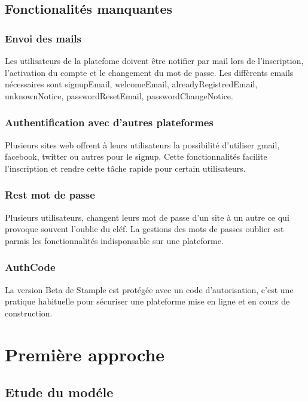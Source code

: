 \documentclass[12pt,oneside,a4paper]{article}
\begin{document}
\subsection{Fonctionalités manquantes}
\subsubsection{Envoi des mails}
Les utilisateurs de la platefome doivent être notifier par mail lors de l'inscription, l'activation du compte et le changement du mot de passe. 
Les diffèrents emails nécessaires sont signupEmail, welcomeEmail, alreadyRegistredEmail, unknownNotice, passwordResetEmail, passwordChangeNotice.
\subsubsection{Authentification avec d'autres plateformes}
Plusieurs sites web offrent à leurs utilisateurs la possibilité d'utiliser gmail, facebook, twitter ou autres pour le signup.
Cette fonctionnalités facilite l'inscription et rendre cette tâche rapide pour certain utilisateurs.
\subsubsection{Rest mot de passe}
Plusieurs utilisateurs, changent leurs mot de passe d'un site à un autre ce qui provoque souvent l'oublie du cléf.
La gestions des mots de passes oublier est parmis les fonctionnalités indisponsable sur une plateforme.
\subsubsection{AuthCode}
La version Beta de Stample est protégée avec un code d'autorisation, c'est une pratique habituelle pour sécuriser une plateforme mise en ligne et en cours de construction.
\section{Première approche}
\subsection{Etude du modéle}
\end{document}
